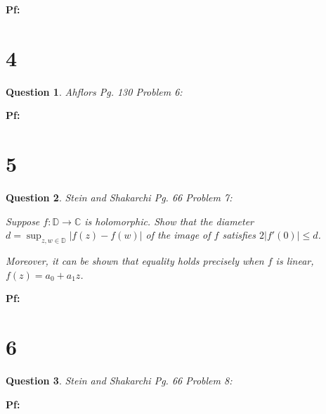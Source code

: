 \documentclass{article}
\newtheorem{question}{Question}
\begin{document}
\textbf{Pf:}

\break

\section*{4}
\begin{myBox}[]{}
    \begin{question}
        Ahflors Pg. 130 Problem 6:
    \end{question}
\end{myBox}

\textbf{Pf:}

\break

\section*{5}
\begin{myBox}[]{}
    \begin{question}
        Stein and Shakarchi Pg. 66 Problem 7:
        
        Suppose $f:\mathbb{D}\rightarrow \mathbb{C}$ is holomorphic. Show that the diameter $d=\sup_{z,w\in\mathbb{D}}|f(z)-f(w)|$ 
        of the image of $f$ satisfies $2|f'(0)| \leq d$.

        Moreover, it can be shown that equality holds precisely when $f$ is linear, $f(z) =
        a_0 + a_1z$.
    \end{question}
\end{myBox}

\textbf{Pf:}



\break

\section*{6}
\begin{myBox}[]{}
    \begin{question}
        Stein and Shakarchi Pg. 66 Problem 8:
    \end{question}
\end{myBox}

\textbf{Pf:}

\break
\end{document}
